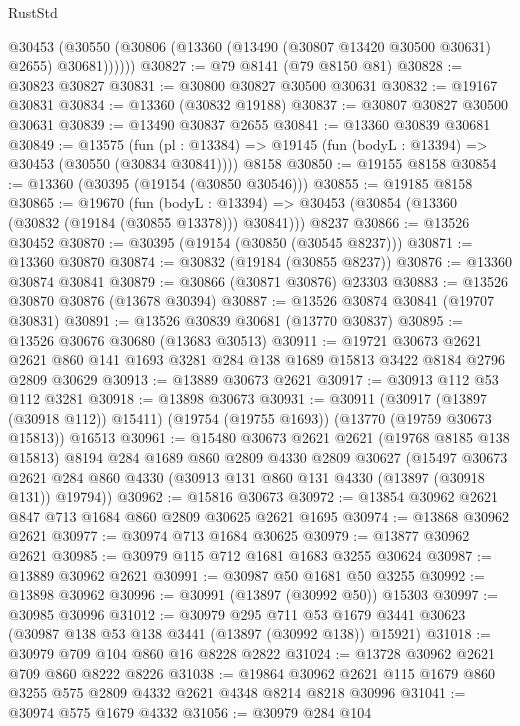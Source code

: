 \begin{lexlean}{RustStd}
\begin{coremodule}
        @30453 (@30550 (@30806 (@13360 (@13490 (@30807 @13420 @30500 @30631) @2655) @30681))))))
@30827 := @79 @8141 (@79 @8150 @81)
@30828 := @30823 @30827
@30831 := @30800 @30827 @30500 @30631
@30832 := @19167 @30831
@30834 := @13360 (@30832 @19188)
@30837 := @30807 @30827 @30500 @30631
@30839 := @13490 @30837 @2655
@30841 := @13360 @30839 @30681
@30849 := @13575
    (fun (pl : @13384) => @19145 (fun (bodyL : @13394) => @30453 (@30550 (@30834 @30841))))
    @8158
@30850 := @19155 @8158
@30854 := @13360 (@30395 (@19154 (@30850 @30546)))
@30855 := @19185 @8158
@30865 := @19670
    (fun (bodyL : @13394) => @30453 (@30854 (@13360 (@30832 (@19184 (@30855 @13378))) @30841)))
    @8237
@30866 := @13526 @30452
@30870 := @30395 (@19154 (@30850 (@30545 @8237)))
@30871 := @13360 @30870
@30874 := @30832 (@19184 (@30855 @8237))
@30876 := @13360 @30874 @30841
@30879 := @30866 (@30871 @30876) @23303
@30883 := @13526 @30870 @30876 (@13678 @30394)
@30887 := @13526 @30874 @30841 (@19707 @30831)
@30891 := @13526 @30839 @30681 (@13770 @30837)
@30895 := @13526 @30676 @30680 (@13683 @30513)
@30911 := @19721
    @30673
    @2621
    @2621
    @860
    @141
    @1693
    @3281
    @284
    @138
    @1689
    @15813
    @3422
    @8184
    @2796
    @2809
    @30629
@30913 := @13889 @30673 @2621
@30917 := @30913 @112 @53 @112 @3281
@30918 := @13898 @30673
@30931 := @30911
    (@30917 (@13897 (@30918 @112)) @15411)
    (@19754 (@19755 @1693))
    (@13770 (@19759 @30673 @15813))
    @16513
@30961 := @15480
    @30673
    @2621
    @2621
    (@19768 @8185 @138 @15813)
    @8194
    @284
    @1689
    @860
    @2809
    @4330
    @2809
    @30627
    (@15497
      @30673
      @2621
      @284
      @860
      @4330
      (@30913 @131 @860 @131 @4330 (@13897 (@30918 @131)) @19794))
@30962 := @15816 @30673
@30972 := @13854 @30962 @2621 @847 @713 @1684 @860 @2809 @30625 @2621 @1695
@30974 := @13868 @30962 @2621
@30977 := @30974 @713 @1684 @30625
@30979 := @13877 @30962 @2621
@30985 := @30979 @115 @712 @1681 @1683 @3255 @30624
@30987 := @13889 @30962 @2621
@30991 := @30987 @50 @1681 @50 @3255
@30992 := @13898 @30962
@30996 := @30991 (@13897 (@30992 @50)) @15303
@30997 := @30985 @30996
@31012 := @30979
    @295
    @711
    @53
    @1679
    @3441
    @30623
    (@30987 @138 @53 @138 @3441 (@13897 (@30992 @138)) @15921)
@31018 := @30979 @709 @104 @860 @16 @8228 @2822
@31024 := @13728 @30962 @2621 @709 @860 @8222 @8226
@31038 := @19864 @30962 @2621 @115 @1679 @860 @3255 @575 @2809 @4332 @2621 @4348 @8214 @8218 @30996
@31041 := @30974 @575 @1679 @4332
@31056 := @30979
    @284
    @104

\end{coremodule}
\end{lexlean}

